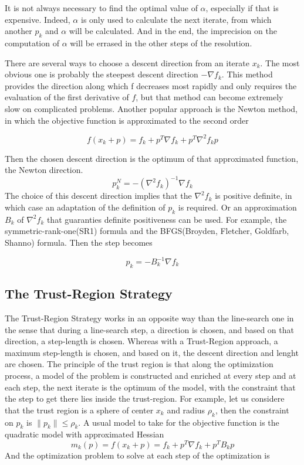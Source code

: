 It is not always necessary to find the optimal value of $\alpha$, especially if
that is expensive. Indeed, $\alpha$ is only used to calculate the next iterate,
from which another $p_k$ and $\alpha$ will be calculated. And in the end, the
imprecision on the computation of $\alpha$ will be errased in the other steps of
the resolution.

There are several ways to choose a descent direction from an iterate $x_k$. The
most obvious one is probably the steepest descent direction $-\nabla f_k$. This
method provides the direction along which f decreases most rapidly and only
requires the evaluation of the first derivative of $f$, but that method can
become extremely slow on complicated problems. Another popular approach is the
Newton method, in which the objective function is approximated to the second
order

\begin{equation}
  f(x_k+p) = f_k + p^T\nabla f_k + p^T\nabla^2f_k p
\end{equation}

Then the chosen descent direction is the optimum of that approximated function,
the Newton direction.
\begin{equation}
  p^N_k = -(\nabla^2 f_k)^{-1} \nabla f_k
\end{equation}
The choice of this descent direction implies that the $\nabla^2f_k$ is positive
definite, in which case an adaptation of the definition of $p_k$ is required. Or
an approximation $B_k$ of $\nabla^2f_k$ that guaranties definite positiveness can be
used. For example, the symmetric-rank-one(SR1) formula and the BFGS(Broyden,
Fletcher, Goldfarb, Shanno) formula. Then the step becomes 

\begin{equation}
  p_k = -B_k^{-1}\nabla f_k
\end{equation}

\subsection{The Trust-Region Strategy}
The Trust-Region Strategy works in an opposite way than the line-search one in
the sense that during a line-search step, a direction is chosen, and based on
that direction, a step-length is chosen. Whereas with a Trust-Region approach, a
maximum step-length is chosen, and based on it, the descent direction and lenght
are chosen.
The principle of the trust region is that along the optimization process, a
model of the problem is constructed and enriched at every step and at each step,
the next iterate is the optimum of the model, with the constraint that the step
to get there lies inside the trust-region. For example, let us considere that
the trust region is a sphere of center $x_k$ and radius $\rho_k$, then the
constraint on $p_k$ is $\|p_k\| \leq \rho_k$. A usual model to take for the
objective function is the quadratic model with approximated Hessian
\begin{equation}
  m_k(p) = f(x_k+p) = f_k + p^T\nabla f_k + p^TB_k p
\end{equation}
And the optimization problem to solve at each step of the optimization is

